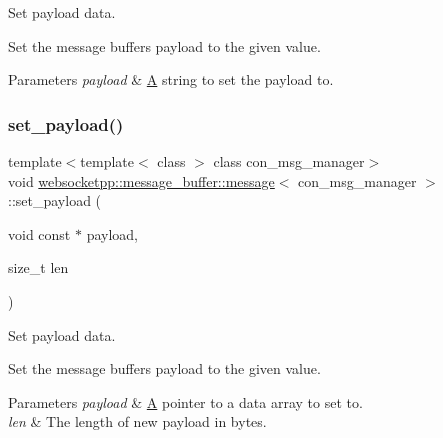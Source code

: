 Set payload data. 

Set the message buffer\textquotesingle{}s payload to the given value.


\begin{DoxyParams}{Parameters}
{\em payload} & \mbox{\hyperlink{struct_a}{A}} string to set the payload to. \\
\hline
\end{DoxyParams}
\mbox{\label{classwebsocketpp_1_1message__buffer_1_1message_a714fd661ca04196d2e5b5834f83512aa}} 
\subsubsection{\texorpdfstring{set\+\_\+payload()}{set\_payload()}\hspace{0.1cm}{\footnotesize\ttfamily [2/2]}}
{\footnotesize\ttfamily template$<$template$<$ class $>$ class con\+\_\+msg\+\_\+manager$>$ \\
void \mbox{\hyperlink{classwebsocketpp_1_1message__buffer_1_1message}{websocketpp\+::message\+\_\+buffer\+::message}}$<$ con\+\_\+msg\+\_\+manager $>$\+::set\+\_\+payload (\begin{DoxyParamCaption}\item[{void const $\ast$}]{payload,  }\item[{size\+\_\+t}]{len }\end{DoxyParamCaption})\hspace{0.3cm}{\ttfamily [inline]}}



Set payload data. 

Set the message buffer\textquotesingle{}s payload to the given value.


\begin{DoxyParams}{Parameters}
{\em payload} & \mbox{\hyperlink{struct_a}{A}} pointer to a data array to set to. \\
\hline
{\em len} & The length of new payload in bytes. \\
\hline
\end{DoxyParams}
\mbox{\label{classwebsocketpp_1_1message__buffer_1_1message_a9b17bf5adb8607c44774a96b340ee55b}} 
